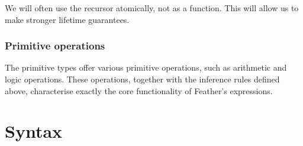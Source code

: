 \documentclass[11pt]{book}
\begin{document}
We will often use the recursor atomically, not as a function.
This will allow us to make stronger lifetime guarantees.

\subsection{Primitive operations}

The primitive types offer various primitive operations, such as arithmetic and logic operations.
These operations, together with the inference rules defined above, characterise exactly the core functionality of Feather's expressions.

\chapter{Syntax}

\iffalse{}
\section{Conventions regarding S-expressions and Feather expressions}

\subsection{Typing}

Previously, we have created types of S-expressions for Feather's syntax.
For example, \lstinline{(const false)} has type \lstinline{Expr}.
There is a need to distinguish between the type of an S-expression and the type of the Feather expression it represents.
These two type systems are logically distinct; the existence of an S-expression type does not imply the existence of a corresponding Feather type, or vice versa.

We define \( \mathcal T(e) \) to be the Feather type of an S-expression \( e : \) \lstinline{Expr}.

Unless otherwise stated, all types in all following sections refer to the Feather type system, so \( x : \tau \) should be interpreted as the judgment `\( x \) is a Feather expression with type \( \tau \)'.
Further, the word `expression' should be taken to mean `Feather expression'.

\subsection{De Bruijn indices}

While de Bruijn indices are useful when processing Feather algorithmically, they are inconvenient to use when discussing the language at a higher level.
To this end, from now on unless otherwise stated, constructs using a de Bruijn index will instead be written as if they use a named variable.
Likewise, binding expressions will be written as if they bind their variables to names.
\fi{}
\end{document}
